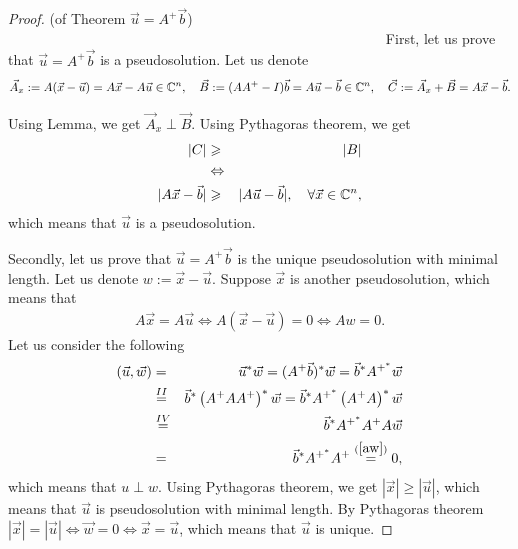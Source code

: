     \begin{proof}(of Theorem $\vec{u} = A^+\vec{b}$)~ ~ ~ ~ ~ ~ ~~ ~ ~ ~ ~ ~ ~~ ~ ~ ~ ~ ~ ~~ ~ ~ ~ ~ ~ ~~ ~ ~ ~ ~ ~ ~~ ~ ~ ~ ~ ~ ~~ ~ ~ ~ ~ ~ ~~ ~ ~ ~ ~ ~ ~~ ~ ~ ~ ~ ~ ~
        First, let us prove that $\vec{u} = A^+\vec{b}$ is a pseudosolution. Let us denote
        $$
            \vec{A}_x:= A(\vec{x}-\vec{u})=A\vec{x}-A\vec{u}\in \mathbb{C}^n,\quad
            \vec{B}  := (AA^+-I)\vec{b}  = A\vec{u}-\vec{b}\in \mathbb{C}^n,\quad
            \vec{C}  := \vec{A}_x+\vec{B} =A\vec{x}-\vec{b}.
        $$
        
         Using Lemma, we get $\vec{A}_x\perp\vec{B}$. Using Pythagoras theorem, we get
         \begin{eqnarray}
            |C|&\geqslant&|B|\nonumber\\
            &\Leftrightarrow&\nonumber\\ 
            |A\vec{x}-\vec{b}|&\geqslant&|A\vec{u}-\vec{b}|,\quad \forall \vec{x}\in \mathbb{C}^n,\nonumber
         \end{eqnarray}
         which means that $\vec{u}$ is a pseudosolution.
    
        Secondly, let us prove that $\vec{u} = A^+\vec{b}$ is the unique pseudosolution with minimal length.  Let us denote $w:=\vec{x}-\vec{u}$. Suppose $\vec{x}$ is another pseudosolution, which means that 
        \begin{eqnarray}   
            A\vec{x}=A\vec{u}
            \Leftrightarrow A(\vec{x}-\vec{u})=0
            \Leftrightarrow Aw=0.\label{aw}
        \end{eqnarray}
        Let us consider the following
        \begin{eqnarray}
          \left(\vec{u}, \vec{w}\right) 
          &=& \vec{u}^* \vec{w} 
          = (A^+\vec{b})^* \vec{w} 
          = \vec{b}^*A^{+^*} \vec{w}\nonumber\\
          &\overset{\rom{2}}{=}& \vec{b}^*\left(A^+AA^+\right)^*\vec{w}  
          = \vec{b}^*A^{+^*}\left(A^+A\right)^*\vec{w}  \nonumber\\
          &\overset{\rom{4}}{=}& \vec{b}^*A^{+^*}A^+A\vec{w}\nonumber\\
          &=&\vec{b}^*A^{+^*}A^+
        \overset{(\ref{aw})}{=} 0,\nonumber
    \end{eqnarray} 
        which means that $u\perp w$. Using Pythagoras theorem, we get $|\vec{x}|\ge|\vec{u}|$, which means that $\vec{u}$ is pseudosolution with minimal length. By Pythagoras theorem $|\vec{x}|=|\vec{u}|\Leftrightarrow\vec{w}=0\Leftrightarrow \vec{x}=\vec{u}$, which means that $\vec{u}$ is unique.
    \end{proof}

